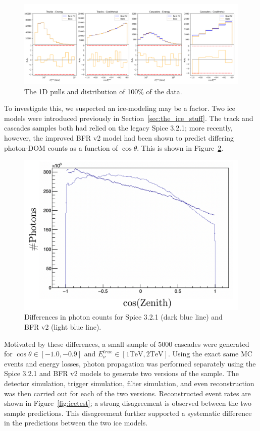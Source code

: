 \documentclass[main.tex]{subfiles}
\begin{document}
\begin{figure}
    \centering
    \includegraphics[width=0.9\linewidth]{./figures/goodness_joint_data_full_IC86_data_full.png}
    \caption{The 1D pulls and distribution of 100\% of the data.}\label{fig:1d_100p_distrib}
\end{figure}


To investigate this, we suspected an ice-modeling may be a factor.
Two ice models were introduced previously in Section~\ref{sec:the_ice_stuff}.
The track and cascades samples both had relied on the legacy Spice 3.2.1; more recently, however, the improved BFR v2 model had been shown to predict differing photon-DOM counts as a function of $\cos\theta$.  
This is shown in Figure~\ref{fig:zenith_bfr}.

\begin{figure}
    \centering
    \includegraphics[width=0.75\linewidth]{./figures/ice_investigate/zenith_bfr.png}
    \caption{Differences in photon counts for Spice 3.2.1 (dark blue line) and BFR v2 (light blue line).}\label{fig:zenith_bfr}
\end{figure}

Motivated by these differences, a small sample of 5000 cascades were generated for $\cos\theta\in\left[-1.0, -0.9\right]$ and $E_{\nu}^{true}\in\left[1\text{TeV}, 2\text{TeV}\right]$. 
Using the exact same MC events and energy losses, photon propagation was performed separately using the Spice 3.2.1 and BFR v2 models to generate two versions of the sample.
The detector simulation, trigger simulation, filter simulation, and even reconstruction was then carried out for each of the two versions. 
Reconstructed event rates are shown in Figure~\ref{fig:icetest}; a strong disagreement is observed between the two sample predictions. 
This disagreement further supported a systematic difference in the predictions between the two ice models. 
\end{document}
